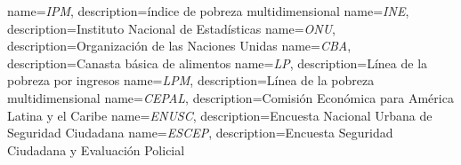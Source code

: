 

{
        name=\textit{IPM},
        description={índice de pobreza multidimensional}
}
{
        name=\textit{INE},
        description={Instituto Nacional de Estadísticas}
}
{
        name=\textit{ONU},
        description={Organización de las Naciones Unidas}
}
{
        name=\textit{CBA},
        description={Canasta básica de alimentos}
}
{
        name=\textit{LP},
        description={Línea de la pobreza por ingresos}
}
{
        name=\textit{LPM},
        description={Línea de la pobreza multidimensional}
}
{
        name=\textit{CEPAL},
        description={Comisión Económica para América Latina y el Caribe}
}
{
        name=\textit{ENUSC},
        description={Encuesta Nacional Urbana de Seguridad Ciudadana}
}
{
        name=\textit{ESCEP},
        description={Encuesta Seguridad Ciudadana y Evaluación Policial}
}
















